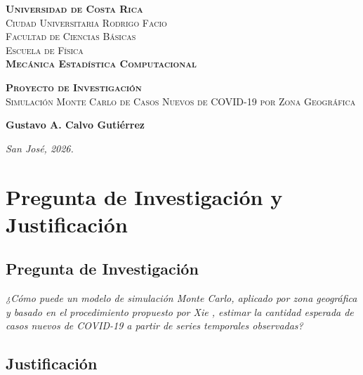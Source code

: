 \documentclass[12pt]{article}
\newcommand{\institucion}{Universidad de Costa Rica}
\newcommand{\campus}{Ciudad Universitaria Rodrigo Facio}
\newcommand{\facultad}{Facultad de Ciencias Básicas}
\newcommand{\escuela}{Escuela de Física}
\newcommand{\curso}{Mecánica Estadística Computacional}
\newcommand{\tituloproyecto}{Proyecto de Investigación}
\newcommand{\titulo}{Simulación Monte Carlo de Casos Nuevos de COVID-19 por Zona Geográfica}
\newcommand{\autor}{Gustavo A. Calvo Gutiérrez}
\newcommand{\lugarfecha}{San José, 2026.}
\begin{document}
\begin{titlepage}
  \begin{center}
    \LARGE \textbf{\textsc{\institucion}}
    \Large
    \\[1cm]
    \textsc{\campus}
    \\[0.1cm]
    \textsc{\facultad}
    \\[0.1cm]
    \textsc{\escuela} \\
    \vspace*{20 mm}
    \LARGE{\textsc{\textbf{\curso}}}
  \end{center}

  \vspace{2cm}

  \hrulefill
  \begin{center}
    \large \textbf{\textsc{\tituloproyecto}}
    \\[0.5cm]
    \textsc{\titulo}
  \end{center}
  \hrulefill

  \vfill

  \begin{center}
    \large \textbf{\autor}
  \end{center}

  \vspace{1cm}

  \begin{center}
    \textit{\lugarfecha}
  \end{center}
\end{titlepage}

\section{Pregunta de Investigación y Justificación}

\subsection{Pregunta de Investigación}

\noindent
\textit{
  ¿Cómo puede un modelo de simulación Monte Carlo, aplicado por zona
  geográfica y basado en el procedimiento propuesto por Xie \cite{Xie2020},
  estimar la cantidad esperada de casos nuevos de COVID-19 a partir de series
  temporales observadas?
}

\subsection{Justificación}
\end{document}
